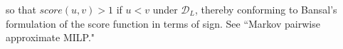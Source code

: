 so that $score(u,v) > 1$ if $u < v$ under $\mathcal{D}_L$, thereby conforming to Bansal's formulation of the score function in terms of sign. See ``Markov pairwise approximate MILP."









